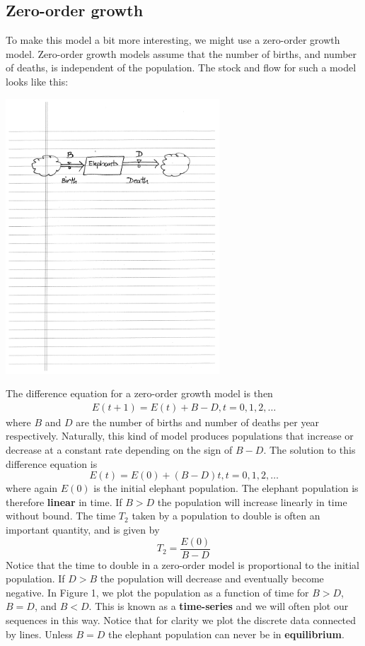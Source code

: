 \documentclass{tufte-handout}
\begin{document}
\subsection{Zero-order growth}

To make this model a bit more interesting, we might use a zero-order growth model.  Zero-order growth models assume that the number of births, and number of deaths, is independent of the population.  The stock and flow for such a model looks like this:

\centerline{\includegraphics[width=8cm]{figs/zero_order_model}}

The difference equation for a zero-order growth model is then
\begin{eqnarray*}
E(t+1) = E(t) + B - D, t = 0,1,2,\ldots
\end{eqnarray*}
where $B$ and $D$ are the number of births and number of deaths per year respectively. Naturally, this kind of model produces populations that increase or decrease at a constant rate depending on the sign of $B-D$. The solution to this difference equation is
$$ E(t) = E(0) + (B-D)t, t = 0,1,2,\ldots $$
where again $E(0)$ is the initial elephant population. The elephant population is therefore {\bf linear} in time. If $B>D$ the population will increase linearly in time without bound. The time $T_2$ taken by a population to double is often an important quantity, and is given by
$$ T_2 = \frac{E(0)}{B-D}$$
Notice that the time to double in a zero-order model is proportional to the initial population. If $D>B$ the population will decrease and eventually become negative. In Figure 1, we plot the population as a function of time for $B>D$, $B=D$, and $B < D$. This is known as a {\bf time-series} and we will often plot our sequences in this way. Notice that for clarity we plot the discrete data connected by lines. Unless $B=D$ the elephant population can never be in {\bf equilibrium}.
\end{document}
